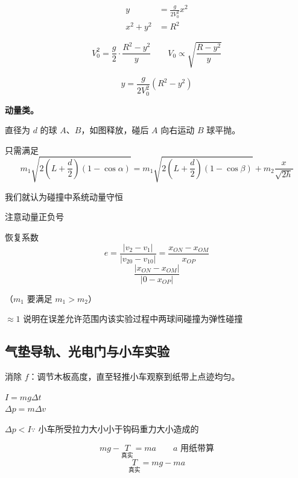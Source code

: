 \begin{align*}
y&=\frac{g}{2V_0^2}x^2\\
x^2+y^2&=R^2
\end{align*}


\[V_0^2=\frac{g}{2}\cdot\frac{R^2-y^2}{y}\qquad V_0\propto\sqrt{\frac{R-y^2}{y}}\] %

\[y=\frac{g}{2V_0^2}(R^2-y^2)\]

\textbf{动量类。}

直径为 $d$ 的球 $A$、$B$，如图释放，碰后 $A$ 向右运动 $B$ 球平抛。


只需满足
\[ m_1\sqrt{2\left(L+\frac{d}{2}\right)(1-\cos\alpha)}=m_1\sqrt{2\left(L+\frac{d}{2}\right)(1-\cos\beta)}+m_2\frac{x}{\sqrt{2h}} \]

我们就认为碰撞中系统动量守恒

注意动量正负号 %


恢复系数
\[ e=\frac{|v_2-v_1|}{|v_{20}-v_{10}|}=\frac{x_{ON}-x_{OM}}{x_{OP}} \]
\[ \frac{|x_{ON}-x_{OM}|}{|0-x_{OP}|} \]

（$m_1$ 要满足 $m_1>m_2$）

$\approx1$ 说明在误差允许范围内该实验过程中两球间碰撞为弹性碰撞

\subsection{气垫导轨、光电门与小车实验}
消除 $f$：调节木板高度，直至轻推小车观察到纸带上点迹均匀。


$I=mg\Delta t$\\
$\Delta p=m\Delta v$

$\Delta p<I$\quad $\because$ 小车所受拉力大小小于钩码重力大小造成的

\[ mg-\underset{\text{真实}}{T}=ma\qquad a\text{ 用纸带算} \]
\[ \underset{\text{真实}}{T}=mg-ma \]

